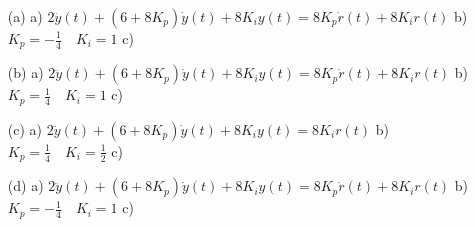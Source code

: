 \documentclass[12pt]{article}
\begin{document}
\begin{itemize}
    \item[(a)] a) \(2\ddot{y}(t) + (6 + 8 K_p) \dot{y}(t) + 8 K_i y(t) = 8 K_p \dot{r}(t) + 8 K_i r(t)\) b) \(K_p = - \frac{1}{4} \quad K_i = 1\) c)     
    \item[(b)] a) \(2\ddot{y}(t) + (6 + 8 K_p) \dot{y}(t) + 8 K_i y(t) = 8 K_p \dot{r}(t) + 8 K_i r(t)\) b) \(K_p =  \frac{1}{4} \quad K_i = 1\) c)     
    \item[(c)] a) \(2\ddot{y}(t) + (6 + 8 K_p) \dot{y}(t) + 8 K_i y(t) =  8 K_i r(t)\) b) \(K_p =  \frac{1}{4} \quad K_i = \frac{1}{2}\) c)     
    \item[(d)] a) \(2\ddot{y}(t) + (6 + 8 K_p) \dot{y}(t) + 8 K_i y(t) = 8 K_p \dot{r}(t) + 8 K_i r(t)\) b) \(K_p = - \frac{1}{4} \quad K_i = 1\) c)     
\end{itemize}
\end{document}
